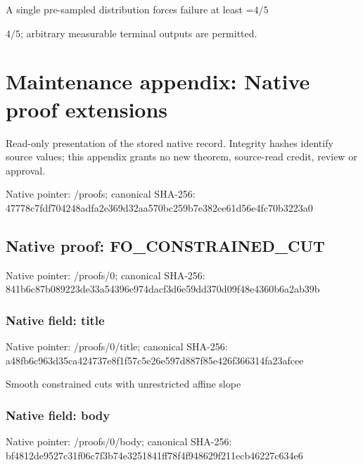 \documentclass[10pt,a4paper]{article}
\newcommand{\AtlasMath}[1]{\par\begingroup\centering\setbox0=\hbox{$\displaystyle #1$}\ifdim\wd0>1.4\linewidth\typeout{ATLAS WIDE FORMULA: \the\wd0}\fi\ifdim\wd0>\linewidth\resizebox{\linewidth}{!}{\box0}\else\box0\fi\par\endgroup}
\newcommand{\AtlasInlineMath}[1]{\begingroup\setbox0=\hbox{$#1$}\ifdim\wd0>.4\linewidth\endgroup\AtlasMath{#1}\else\endgroup$#1$\fi}
\begin{document}
A single pre-sampled distribution forces failure at least \AtlasInlineMath{4/5}; arbitrary measurable terminal outputs are permitted.



\section{Maintenance appendix: Native proof extensions}


Read-only presentation of the stored native record. Integrity hashes identify source values; this appendix grants no new theorem, source-read credit, review or approval.



Native pointer: /proofs; canonical SHA-256: 47778c7fdf704248adfa2e36\allowbreak{}9d32aa570bc259b7e382ee61\allowbreak{}d56e4fc70b3223a0



\subsection{Native proof: FO\_CONSTRAINED\_CUT}


Native pointer: /proofs/0; canonical SHA-256: 841b6c87b089223de33a5439\allowbreak{}6e974dacf3d6e59dd370d09f\allowbreak{}48e4360b6a2ab39b



\subsubsection{Native field: title}


Native pointer: /proofs/0/title; canonical SHA-256: a48fb6c963d35ca424737e8f\allowbreak{}1f57c5e26e597d887f85e426\allowbreak{}f366314fa23afcee


Smooth constrained cuts with unrestricted affine slope


\subsubsection{Native field: body}


Native pointer: /proofs/0/body; canonical SHA-256: bf4812de9527c31f06c7f3b7\allowbreak{}4e3251841ff78f4f948629f2\allowbreak{}11ecb46227c634e6
\end{document}
